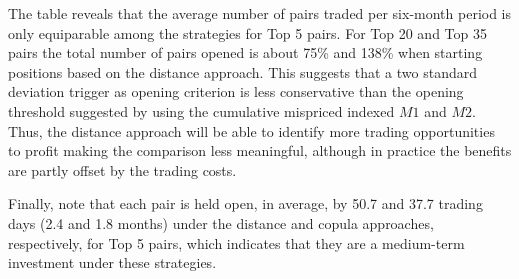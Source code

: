 \documentclass[a4paper,12pt]{report}
\begin{document}
\begin{refsection}
The table reveals that the average number of pairs traded per six-month period is only equiparable among the strategies for Top 5 pairs. For Top 20 and Top 35 pairs the total number of pairs opened is about 75\% and 138\% when starting positions based on the distance approach. This suggests that a two standard deviation trigger as opening criterion is less conservative than the opening threshold suggested by \citet*{rf15} using the cumulative mispriced indexed $M1$ and $M2$. Thus, the distance approach will be able to identify more trading opportunities to profit making the comparison less meaningful, although in practice the benefits are partly offset by the trading costs.


%	
%	
%	
%	

Finally, note that each pair is held open, in average, by 50.7 and 37.7 trading days (2.4 and 1.8 months) under the distance and copula approaches, respectively, for Top 5 pairs, which indicates that they are a medium-term investment under these strategies.\\


\end{refsection}
\end{document}

